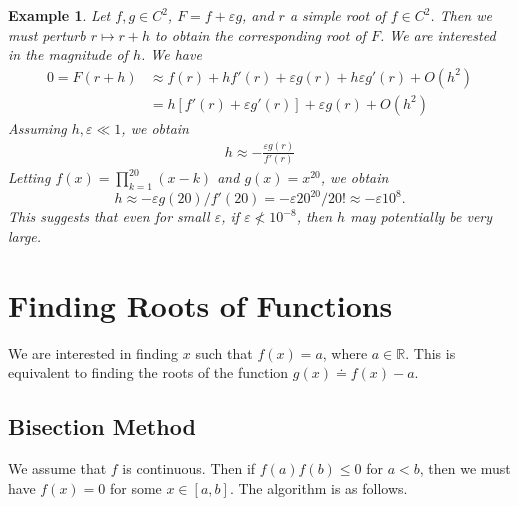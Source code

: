 \documentclass[12pt,reqno]{amsart}
\numberwithin{equation}{section}  %
\newcommand{\rr}{\mathbb{R}}
\newcommand{\ee}{\varepsilon}
\newtheorem{example}{Example}[section]
\begin{document}
\begin{example}
Let $f, g \in C^2$, $F = f + \ee g$, and $r$ a simple root of $f \in C^2$.
Then we must perturb $r \mapsto r + h$ to obtain the corresponding
root of $F$. We are interested in the magnitude of $h$. We have
\begin{align*}
0 = F(r + h) & \approx f(r) + hf'(r) + \ee g(r) + h\ee g'(r) + O(h^2)
\\
& = h[f'(r)  + \ee g'(r)] + \ee g(r)  + O(h^2)
\end{align*}
Assuming $h, \ee \ll 1$, we obtain 
\begin{align*}
h \approx -\frac{\ee g(r)}{f'(r)}
\end{align*}
Letting $f(x) = \prod_{k=1}^{20} (x-k)$ and $g(x) = x^{20}$, we obtain
\[h \approx -\ee g(20)/f'(20) = -\ee 20^20/20! \approx -\ee 10^8.\]
This suggests that even for small $\ee$, if $\ee \not < 10^{-8}$,
then $h$ may potentially be very large. 
\end{example}
\section{Finding Roots of Functions}
We are interested in finding $x$ such that
$f(x) = a$, where $a \in \rr$. This is equivalent to finding
the roots of the function $g(x) \doteq f(x) - a$.
\subsection{Bisection Method}
We assume that $f$ is continuous. Then if $f(a)f(b) \le 0$ for $a < b$,
then we must have $f(x) = 0$ for some $x \in [a,b]$. The algorithm is as follows.
\end{document}
